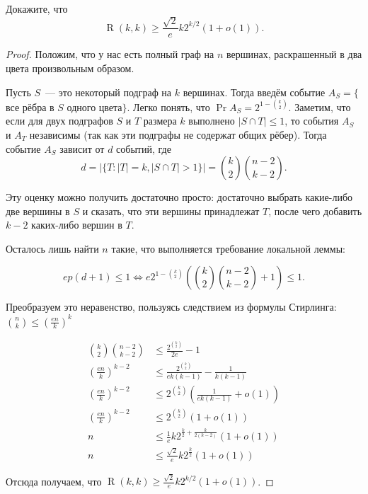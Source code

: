 \begin{problem}[Спенсер, 1974]
    Докажите, что \[\operatorname{R}(k, k) \geq \frac{\sqrt{2}}{e}k2^{k/2}(1 + o(1)).\]
\end{problem}
\begin{proof}
     Положим, что у нас есть полный граф на \(n\) вершинах, раскрашенный в два цвета произвольным образом.
    
     Пусть \(S\)~--- это некоторый подграф на \(k\) вершинах. Тогда введём событие \(A_{S} = \{\)все рёбра в \(S\) одного цвета\(\}\). Легко понять, что \(\Pr{A_S} = 2^{1 - \binom{k}{2}}\). Заметим, что если для двух подграфов \(S\) и \(T\) размера \(k\) выполнено \(|S \cap T| \leq 1\), то события \(A_{S}\) и \(A_{T}\) независимы (так как эти подграфы не содержат общих рёбер). Тогда событие \(A_{S}\) зависит от \(d\) событий, где
     \[d = \left|\{T : |T| = k, |S \cap T| > 1\}\right| = \binom{k}{2}\binom{n - 2}{k - 2}.\]
     
     Эту оценку можно получить достаточно просто: достаточно выбрать какие-либо две вершины в \(S\) и сказать, что эти вершины принадлежат \(T\), после чего добавить \(k - 2\) каких-либо вершин в \(T\).
     
     Осталось лишь найти \(n\) такие, что выполняется требование локальной леммы:
     
     \[ep(d + 1) \leq 1 \iff e2^{1 - \binom{k}{2}}\left(\binom{k}{2}\binom{n - 2}{k - 2} + 1\right) \leq 1.\]
     
     Преобразуем это неравенство, пользуясь следствием из формулы Стирлинга: \(\binom{n}{k} \leq \left(\frac{en}{k}\right)^{k}\)
     
     \[\begin{aligned}
     \binom{k}{2}\binom{n - 2}{k - 2} &\leq \frac{2^{\binom{k}{2}}}{2e} - 1 \\
     \left(\frac{en}{k}\right)^{k - 2} &\leq \frac{2^{\binom{k}{2}}}{ek(k - 1)} - \frac{1}{k(k - 1)} \\
     \left(\frac{en}{k}\right)^{k - 2} &\leq 2^{\binom{k}{2}}\left(\frac{1}{ek(k - 1)} + o(1)\right) \\
     \left(\frac{en}{k}\right)^{k - 2} &\leq 2^{\binom{k}{2}}\left(1 + o(1)\right) \\
     n &\leq \frac{1}{e}k2^{\frac{k}{2} + \frac{k}{2(k - 2)}}(1 + o(1)) \\
     n &\leq \frac{\sqrt{2}}{e}k2^{\frac{k}{2}}(1 + o(1))
     \end{aligned}\]
     
     Отсюда получаем, что \(\operatorname{R}(k, k) \geq \frac{\sqrt{2}}{e}k2^{k/2}(1 + o(1))\).
     
\end{proof}